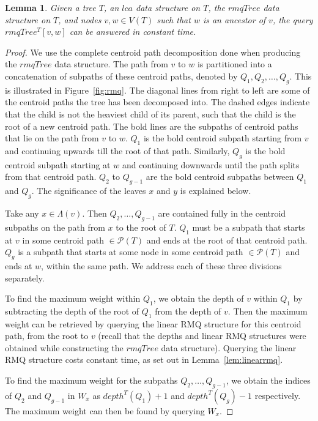 \documentclass[final,1p,times]{elsarticle}
\newcommand{\leafset}{\Lambda}
\newtheorem{lemma}[theorem]{Lemma}
\begin{document}
    \medskip
    \begin{lemma}
        \label{lem:rmqquery}
        Given a tree $T$, an $lca$ data structure on $T$, the $rmqTree$ data structure on $T$, and nodes $v, w \in V(T)$ such that $w$ is an ancestor of $v$, the query $rmqTree^T[v, w]$ can be answered in constant time.
    \end{lemma}
        \begin{proof}
            We use the complete centroid path decomposition done when producing the $rmqTree$ data structure. The path from $v$ to $w$ is partitioned into a concatenation of subpaths of these centroid paths, denoted by $Q_1, Q_2, \ldots, Q_g$. This is illustrated in Figure~\ref{fig:rmq}. The diagonal lines from right to left are some of the centroid paths the tree has been decomposed into. The dashed edges indicate that the child is not the heaviest child of its parent, such that the child is the root of a new centroid path. The bold lines are the subpaths of centroid paths that lie on the path from $v$ to $w$. $Q_1$ is the bold centroid subpath starting from $v$ and continuing upwards till the root of that path. Similarly, $Q_g$ is the bold centroid subpath starting at $w$ and continuing downwards until the path splits from that centroid path. $Q_2$ to $Q_{g - 1}$ are the bold centroid subpaths between $Q_1$ and $Q_g$. The significance of the leaves $x$ and $y$ is explained below.

            Take any $x \in \leafset(v)$. Then $Q_2, \ldots, Q_{g - 1}$ are contained fully in the centroid subpaths on the path from $x$ to the root of $T$. $Q_1$ must be a subpath that starts at $v$ in some centroid path $\in \mathcal{P}(T)$ and ends at the root of that centroid path. $Q_g$ is a subpath that starts at some node in some centroid path $\in \mathcal{P}(T)$ and ends at $w$, within the same path. We address each of these three divisions separately.

            To find the maximum weight within $Q_1$, we obtain the depth of $v$ within $Q_1$ by subtracting the depth of the root of $Q_1$ from the depth of $v$. Then the maximum weight can be retrieved by querying the linear RMQ structure for this centroid path, from the root to $v$ (recall that the depths and linear RMQ structures were obtained while constructing the $rmqTree$ data structure). Querying the linear RMQ structure costs constant time, as set out in Lemma~\ref{lem:linearrmq}.

            To find the maximum weight for the subpaths $Q_2, \ldots, Q_{g - 1}$, we obtain the indices of $Q_2$ and $Q_{g-1}$ in $W_x$ as $depth^{T}(Q_1) + 1$ and $depth^{T}(Q_g) - 1$ respectively. The maximum weight can then be found by querying $W_x$.


\end{proof}
\end{document}
